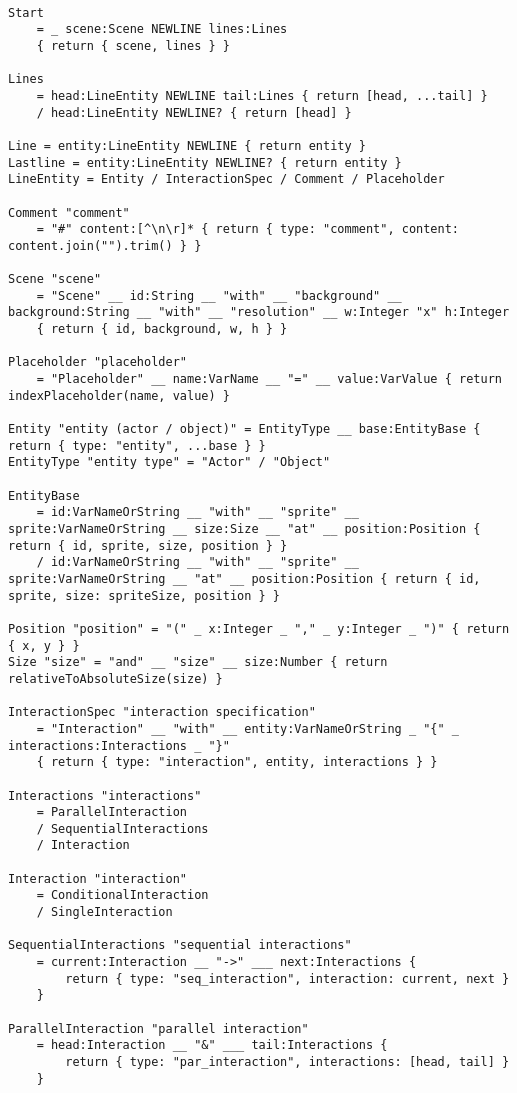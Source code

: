 \begin{lstlisting}[language=PEG, label={app:pca:grammar2}, caption={The pca Language Grammar}]

Start
	= _ scene:Scene NEWLINE lines:Lines
    { return { scene, lines } }

Lines
	= head:LineEntity NEWLINE tail:Lines { return [head, ...tail] }
	/ head:LineEntity NEWLINE? { return [head] }

Line = entity:LineEntity NEWLINE { return entity }
Lastline = entity:LineEntity NEWLINE? { return entity }
LineEntity = Entity / InteractionSpec / Comment / Placeholder

Comment "comment"
	= "#" content:[^\n\r]* { return { type: "comment", content: content.join("").trim() } }

Scene "scene"
	= "Scene" __ id:String __ "with" __ "background" __ background:String __ "with" __ "resolution" __ w:Integer "x" h:Integer
    { return { id, background, w, h } }

Placeholder "placeholder"
	= "Placeholder" __ name:VarName __ "=" __ value:VarValue { return indexPlaceholder(name, value) }

Entity "entity (actor / object)" = EntityType __ base:EntityBase { return { type: "entity", ...base } }
EntityType "entity type" = "Actor" / "Object"

EntityBase
	= id:VarNameOrString __ "with" __ "sprite" __ sprite:VarNameOrString __ size:Size __ "at" __ position:Position { return { id, sprite, size, position } }
	/ id:VarNameOrString __ "with" __ "sprite" __ sprite:VarNameOrString __ "at" __ position:Position { return { id, sprite, size: spriteSize, position } }

Position "position" = "(" _ x:Integer _ "," _ y:Integer _ ")" { return { x, y } }
Size "size" = "and" __ "size" __ size:Number { return relativeToAbsoluteSize(size) }

InteractionSpec "interaction specification"
	= "Interaction" __ "with" __ entity:VarNameOrString _ "{" _ interactions:Interactions _ "}"
    { return { type: "interaction", entity, interactions } }

Interactions "interactions"
    = ParallelInteraction
	/ SequentialInteractions
    / Interaction

Interaction "interaction"
    = ConditionalInteraction
    / SingleInteraction
    
SequentialInteractions "sequential interactions"
	= current:Interaction __ "->" ___ next:Interactions {
    	return { type: "seq_interaction", interaction: current, next }
    }

ParallelInteraction "parallel interaction"
	= head:Interaction __ "&" ___ tail:Interactions {
    	return { type: "par_interaction", interactions: [head, tail] }
    }
\end{lstlisting}
